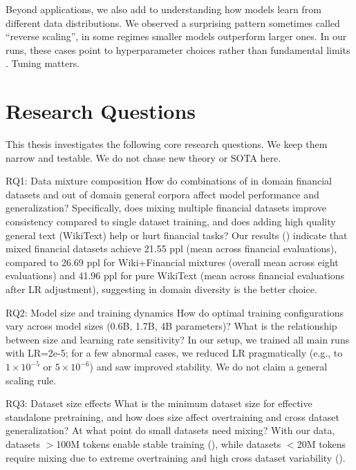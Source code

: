 Beyond applications, we also add to understanding how models learn from different data distributions. We observed a surprising pattern sometimes called ``reverse scaling'', in some regimes smaller models outperform larger ones. In our runs, these cases point to hyperparameter choices rather than fundamental limits \parencite{kaplan2020scaling,hoffmann2022training,mccandlish2018empirical}. Tuning matters.

\section{Research Questions}

This thesis investigates the following core research questions. We keep them narrow and testable. We do not chase new theory or SOTA here.

RQ1: Data mixture composition
How do combinations of in domain financial datasets and out of domain general corpora affect model performance and generalization? Specifically, does mixing multiple financial datasets improve consistency compared to single dataset training, and does adding high quality general text (WikiText) help or hurt financial tasks? Our results () indicate that mixed financial datasets achieve 21.55 ppl (mean across financial evaluations), compared to 26.69 ppl for Wiki+Financial mixtures (overall mean across eight evaluations) and 41.96 ppl for pure WikiText (mean across financial evaluations after LR adjustment), suggesting in domain diversity is the better choice.

RQ2: Model size and training dynamics
How do optimal training configurations vary across model sizes (0.6B, 1.7B, 4B parameters)? What is the relationship between size and learning rate sensitivity? In our setup, we trained all main runs with LR=2e-5; for a few abnormal cases, we reduced LR pragmatically (e.g., to $1\times10^{-5}$ or $5\times10^{-6}$) and saw improved stability. We do not claim a general scaling rule.

RQ3: Dataset size effects
What is the minimum dataset size for effective standalone pretraining, and how does size affect overtraining and cross dataset generalization? At what point do small datasets need mixing? With our data, datasets $>$100M tokens enable stable training (), while datasets $<$20M tokens require mixing due to extreme overtraining and high cross dataset variability ().

